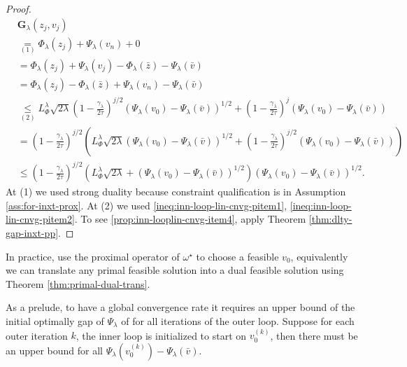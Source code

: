\documentclass[12pt]{article}
\begin{document}
\begin{proof}
            \begin{align*}
                & \mathbf G_\lambda(z_j, v_j) 
                \\
                &\underset{(1)}{=} \Phi_\lambda(z_j) + \Psi_\lambda(v_n) + 0
                \\
                &= \Phi_\lambda(z_j) + \Psi_\lambda(v_j) - \Phi_\lambda(\bar z) - \Psi_\lambda(\bar v)
                \\
                &= \Phi_\lambda(z_j)- \Phi_\lambda(\bar z) + \Psi_\lambda(v_n) - \Psi_\lambda(\bar v)
                \\
                &\underset{(2)}{\le} 
                L_\Phi^\lambda \sqrt{2\lambda}\left(
                    1 - \frac{\gamma_\lambda}{2\tau}
                \right)^{j/2}\left(
                    \Psi_\lambda(v_0) - \Psi_\lambda(\bar v)
                \right)^{1/2}
                + \left(
                    1 - \frac{\gamma_\lambda}{2\tau}
                \right)^{j}\left(
                    \Psi_\lambda(v_0) - \Psi_\lambda(\bar v)
                \right)
                \\
                &= \left(
                    1 - \frac{\gamma_\lambda}{2\tau}
                \right)^{j/2}\left(
                    L_\Phi^\lambda \sqrt{2\lambda}\left(
                        \Psi_\lambda(v_0) - \Psi_\lambda(\bar v)
                    \right)^{1/2} 
                    + 
                    \left(
                        1 - \frac{\gamma_\lambda}{2\tau}
                    \right)^{j/2} (\Psi_\lambda(v_0) - \Psi_\lambda(\bar v))
                \right)
                \\
                &\le 
                \left(
                    1 - \frac{\gamma_\lambda}{2\tau}
                \right)^{j/2}\left(
                    L_\Phi^\lambda \sqrt{2\lambda}
                    + 
                    (\Psi_\lambda(v_0) - \Psi_\lambda(\bar v))^{1/2}
                \right)
                \left(
                        \Psi_\lambda(v_0) - \Psi_\lambda(\bar v)
                    \right)^{1/2} . 
            \end{align*}
            At (1) we used strong duality because constraint qualification is in Assumption \ref{ass:for-inxt-prox}. 
            At (2) we used \eqref{ineq:inn-loop-lin-cnvg-pitem1}, \eqref{ineq:inn-loop-lin-cnvg-pitem2}. 
            To see \ref{prop:inn-looplin-cnvg-item4}, apply Theorem \ref{thm:dlty-gap-inxt-pp}. 
        \end{proof}
        \begin{remark}
            In practice, use the proximal operator of $\omega^\star$ to choose a feasible $v_0$, equivalently we can translate any primal feasible solution into a dual feasible solution using Theorem \ref{thm:primal-dual-trans}. 
            \par
            As a prelude, to have a global convergence rate it requires an upper bound of the initial optimally gap of $\Psi_\lambda$ of for all iterations of the outer loop. 
            Suppose for each outer iteration $k$, the inner loop is initialized to start on $v_0^{(k)}$, then there must be an upper bound for all $\Psi_\lambda\left(v_0^{(k)}\right) - \Psi_\lambda(\bar v)$. 
        \end{remark}
\end{document}
